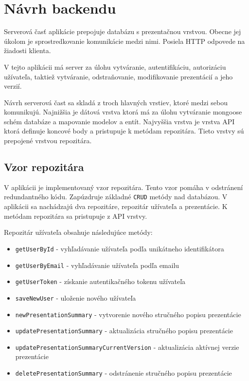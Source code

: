 \section{Návrh backendu}
Serverová časť aplikácie prepojuje databázu s prezentačnou vrstvou. Obecne jej úkolom je sprostredkovanie komunikácie medzi nimi. Posiela HTTP odpovede na žiadosti klienta.

V tejto aplikácii má server za úlohu vytváranie, autentifikáciu, autorizáciu užívateľa, taktiež vytváranie, odstraňovanie, modifikovanie prezentácií a jeho verzií.

Návrh serverová čast sa skladá z troch hlavných vrstiev, ktoré medzi sebou komunikujú. Najnižšia je dátová vrstva ktorá má za úlohu vytváranie mongoose schém databáze a mapovanie modelov a entít. Najvyššia vrstva je vrstva API ktorá definuje koncové body a pristupuje k metódam repozitára. Tieto vrstvy sú prepojené vrstvou repozitára.

\subsection*{Vzor repozitára}
\label{repository}
V aplikácii je implementovaný vzor repozitára. Tento vzor pomáha v odstránení redundantného kódu. Zapúzdruje základné \texttt{CRUD} metódy nad databázou. V aplikácii sa nachádzajú dva repozitáre, repozitár užívateľa a prezentácie. K metódam repozitára sa pristupuje z API vrstvy. 

\vspace{5mm}
\clearpage

Repozitár užívateľa obsahuje následujúce metódy:
    \begin{itemize}
        \item\texttt{getUserById} - vyhľadávanie užívateľa podľa unikátneho identifikátora
        \item\texttt{getUserByEmail} - vyhľadávanie užívateľa podľa emailu
        \item\texttt{getUserToken} - získanie autentikačného tokenu užívateľa
        \item\texttt{saveNewUser} - uloženie nového užívateľa
        \item\texttt{newPresentationSummary} - vytvorenie nového stručného popisu prezentácie
        \item\texttt{updatePresentationSummary} - aktualizácia stručného popisu prezentácie
        \item\texttt{updatePresentationSummaryCurrentVersion} - aktualizácia aktívnej verzie prezentácie
        \item\texttt{deletePresentationSummary} - odstránenie stručného popisu prezentácie
    \end{itemize}
    
